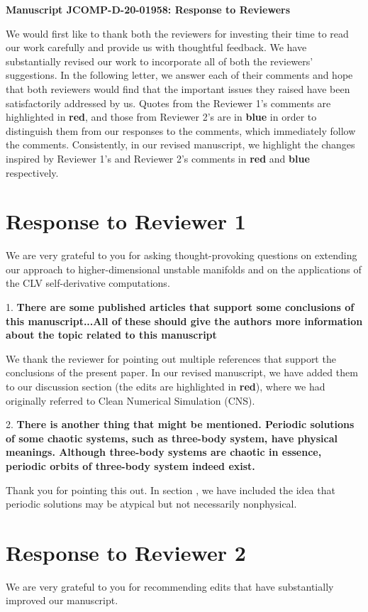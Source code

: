\documentclass[11pt]{article}
\title{}
\author{}
\date{30th October 2020}
\newcommand{\reviewerOne}[1]{{\color{burgundy}\textbf{#1}}}
\newcommand{\reviewerTwo}[1]{{\color{azure}\textbf{#1}}}
\begin{document}
\begin{center}
		\Large{\textbf{Manuscript JCOMP-D-20-01958: Response to Reviewers}}
\end{center}
\medskip
We would first like to thank both the reviewers for investing their time to read our work carefully and provide us with thoughtful feedback. We have substantially revised our work to incorporate all of both the reviewers' suggestions. In the following letter, we answer each of their comments and hope that both reviewers would find that the 
important issues they raised have been satisfactorily addressed by us.
Quotes from the Reviewer 1's comments are highlighted in \reviewerOne{red}, and those from Reviewer 2's are in \reviewerTwo{blue} in order to distinguish them from our responses to the comments, which immediately follow the comments. Consistently, in our revised manuscript, we highlight the changes inspired by Reviewer 1's and Reviewer 2's comments in \reviewerOne{red} and \reviewerTwo{blue} respectively.
\section{Response to Reviewer 1}
We are very grateful to you for asking thought-provoking
questions on extending our approach to higher-dimensional unstable manifolds 
and on the applications of the CLV self-derivative computations.

1. \reviewerOne{There are some published articles that support some conclusions of this manuscript...All of these should give the authors more information about the topic related to this manuscript}

We thank the reviewer for pointing out multiple references that support the conclusions of the present paper. In our revised manuscript, we have added them to our discussion section (the edits are highlighted in \reviewerOne{red}), where we had originally referred to Clean Numerical Simulation (CNS).


2. \reviewerOne{There is another thing that might be mentioned.  Periodic solutions of some chaotic systems, such as three-body system, have physical meanings.  Although three-body systems are chaotic in essence, periodic orbits of three-body system indeed exist.}

Thank you for pointing this out. In section , we have included the idea that periodic solutions may be atypical but not necessarily nonphysical.

\section*{Response to Reviewer 2}
We are very grateful to you for recommending edits that have substantially improved our manuscript.
\end{document}
